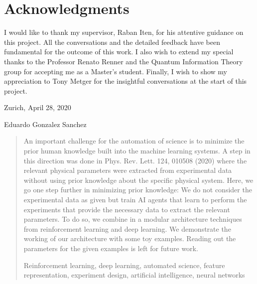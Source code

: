 \documentclass[11pt,a4paper,twoside]{report}
\newcommand{\+}{\textnormal{+} }
\theoremstyle{definition}
\numberwithin{equation}{chapter}
\begin{document}
%
%
%
\chapter*{Acknowledgments}
I would like to thank my supervisor, Raban Iten, for his attentive guidance on
this project. All the conversations and the detailed feedback have been
fundamental for the outcome of this work. I also wish to extend my special
thanks to the Professor Renato Renner and the Quantum Information Theory group
for accepting me as a Master's student. Finally, I wish to show my appreciation
to Tony Metger for the insightful conversations at the start of this project.

\vspace{1.1cm}
\noindent
Zurich,  April 28, 2020

\vspace{2.4cm}
\noindent
Eduardo Gonzalez Sanchez
\thispagestyle{plain}
\clearpage

\thispagestyle{plain}
\cleardoublepage
%
%
%
\huge
\begin{abstract}
  \setcounter{page}{5}
\thispagestyle{plain}
  \normalsize
  \vspace{0.5cm}


\noindent An important challenge for the automation of science is to minimize
the prior human knowledge built into the machine learning systems. A step in
this direction was done in Phys. Rev. Lett. 124, 010508 (2020) where the
relevant physical parameters were extracted from experimental data without using
prior knowledge about the specific physical system. Here, we go one step further
in minimizing prior knowledge: We do not consider the experimental data as given
but train AI agents that learn to perform the experiments that provide the
necessary data to extract the relevant parameters. To do so, we combine in a
modular architecture techniques from reinforcement learning and deep learning.
We demonstrate the working of our architecture with some toy examples. Reading
out the parameters for the given examples is left for future work.
\vspace{3mm}

\noindent 

\vspace{10mm}
Reinforcement learning, deep learning, automated science, feature representation, 
experiment design, artificial intelligence, neural networks
\end{abstract}
\end{document}

